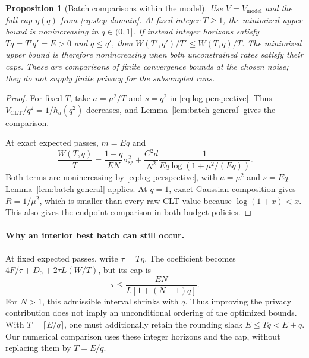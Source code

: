 \documentclass[11pt]{article}
\newtheorem{proposition}[theorem]{Proposition}
\newcommand{\sg}{\mathrm{sg}}
\begin{document}
\begin{proposition}[Batch comparisons within the model]\label{prop:clt-batch}
Use $V=V_{\mathrm{model}}$ and the full cap $\bar\eta(q)$ from
\eqref{eq:step-domain}. At fixed integer $T\ge1$, the minimized upper bound
is nonincreasing in $q\in(0,1]$.
If instead integer horizons satisfy $Tq=T'q'=E>0$ and $q\le q'$, then
$W(T',q')/T'\le W(T,q)/T$. The minimized upper bound is therefore
nonincreasing when both unconstrained rates satisfy their caps.
These are comparisons of finite convergence bounds at the chosen noise;
they do not supply finite privacy for the subsampled runs.
\end{proposition}
\begin{proof}
For fixed $T$, take $a=\mu^2/T$ and $s=q^2$ in
\eqref{eq:log-perspective}. Thus $V_{\mathrm{CLT}}/q^2=1/h_a(q^2)$
decreases, and Lemma~\ref{lem:batch-general} gives the comparison.

At exact expected passes, $m=Eq$ and
\begin{equation}\label{eq:clt-fixed-passes}
 \frac{W(T,q)}T
 =\frac{1-q}{EN}\sigma_{\sg}^2+
   \frac{C^2d}{N^2}\frac{1}{Eq\log(1+\mu^2/(Eq))}.
\end{equation}
Both terms are nonincreasing by \eqref{eq:log-perspective}, with
$a=\mu^2$ and $s=Eq$. Lemma~\ref{lem:batch-general} applies. At $q=1$, exact Gaussian
composition gives $R=1/\mu^2$, which is smaller than every raw CLT value
because $\log(1+x)<x$. This also gives the endpoint comparison in both
budget policies.
\end{proof}

\paragraph{Why an interior best batch can still occur.}
At fixed expected passes, write $\tau=T\eta$. The coefficient becomes
$4F/\tau+D_0+2\tau L(W/T)$, but its cap is
\[
 \tau\le\frac{EN}{L[1+(N-1)q]}.
\]
For $N>1$, this admissible interval shrinks with $q$. Thus improving the
privacy contribution does not imply an unconditional ordering of the
optimized bounds. With $T=\lceil E/q\rceil$, one must additionally retain
the rounding slack $E\le Tq<E+q$. Our numerical comparison uses these
integer horizons and the cap, without replacing them by $T=E/q$.
\end{document}
